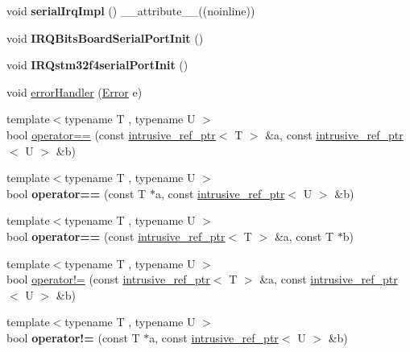 \begin{DoxyCompactItemize}
\item 
\hypertarget{namespacemiosix_ad2bab664e783e40054df546a8a22fa16}{void {\bfseries serial\-Irq\-Impl} () \-\_\-\-\_\-attribute\-\_\-\-\_\-((noinline))}\label{namespacemiosix_ad2bab664e783e40054df546a8a22fa16}

\item 
\hypertarget{namespacemiosix_a2a91a91b87c6756a09055c1e5fa02897}{void {\bfseries I\-R\-Q\-Bits\-Board\-Serial\-Port\-Init} ()}\label{namespacemiosix_a2a91a91b87c6756a09055c1e5fa02897}

\item 
\hypertarget{namespacemiosix_af46ec933f804fbdbf8b6432a3572806d}{void {\bfseries I\-R\-Qstm32f4serial\-Port\-Init} ()}\label{namespacemiosix_af46ec933f804fbdbf8b6432a3572806d}

\item 
void \hyperlink{namespacemiosix_aecda173e5927720cd233599817c5da23}{error\-Handler} (\hyperlink{namespacemiosix_ac0146189e7df18439dc2f4103f07cfe8}{Error} e)
\item 
{\footnotesize template$<$typename T , typename U $>$ }\\bool \hyperlink{namespacemiosix_ab404b6eb081554ff38cbbad5b7f1f5fa}{operator==} (const \hyperlink{classmiosix_1_1intrusive__ref__ptr}{intrusive\-\_\-ref\-\_\-ptr}$<$ T $>$ \&a, const \hyperlink{classmiosix_1_1intrusive__ref__ptr}{intrusive\-\_\-ref\-\_\-ptr}$<$ U $>$ \&b)
\item 
\hypertarget{namespacemiosix_a8ae2ade874be5bb73c9b0f0c43488d72}{{\footnotesize template$<$typename T , typename U $>$ }\\bool {\bfseries operator==} (const T $\ast$a, const \hyperlink{classmiosix_1_1intrusive__ref__ptr}{intrusive\-\_\-ref\-\_\-ptr}$<$ U $>$ \&b)}\label{namespacemiosix_a8ae2ade874be5bb73c9b0f0c43488d72}

\item 
\hypertarget{namespacemiosix_ad5314a10184e798d8d084710228d2f34}{{\footnotesize template$<$typename T , typename U $>$ }\\bool {\bfseries operator==} (const \hyperlink{classmiosix_1_1intrusive__ref__ptr}{intrusive\-\_\-ref\-\_\-ptr}$<$ T $>$ \&a, const T $\ast$b)}\label{namespacemiosix_ad5314a10184e798d8d084710228d2f34}

\item 
{\footnotesize template$<$typename T , typename U $>$ }\\bool \hyperlink{namespacemiosix_a71e50998c9639158664df451d99e3cef}{operator!=} (const \hyperlink{classmiosix_1_1intrusive__ref__ptr}{intrusive\-\_\-ref\-\_\-ptr}$<$ T $>$ \&a, const \hyperlink{classmiosix_1_1intrusive__ref__ptr}{intrusive\-\_\-ref\-\_\-ptr}$<$ U $>$ \&b)
\item 
\hypertarget{namespacemiosix_af4118110867406e8c9fcd1f38811c4a6}{{\footnotesize template$<$typename T , typename U $>$ }\\bool {\bfseries operator!=} (const T $\ast$a, const \hyperlink{classmiosix_1_1intrusive__ref__ptr}{intrusive\-\_\-ref\-\_\-ptr}$<$ U $>$ \&b)}\label{namespacemiosix_af4118110867406e8c9fcd1f38811c4a6}


\end{DoxyCompactItemize}

